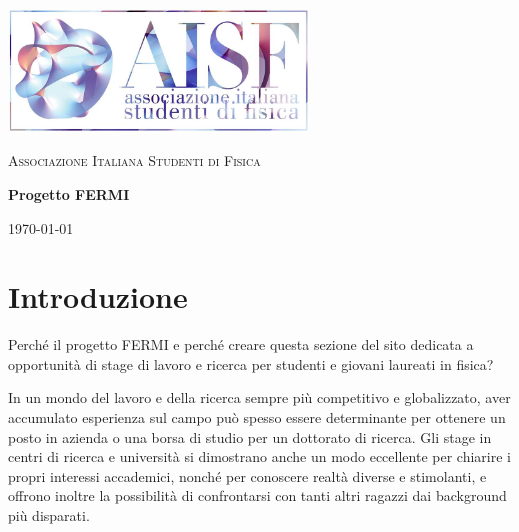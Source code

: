 \documentclass[a4paper,10pt]{article}
\begin{document}
\begin{titlepage}

  \centering
  \includegraphics[width= 80mm]{logo_full.jpg}\par\vspace{1cm}
  {\scshape\LARGE Associazione Italiana Studenti di Fisica \par}
  \vspace{3cm}
  {\huge\bfseries Progetto FERMI\par}

        \vspace{2cm}
  \vfill

  {\centering \large \today\par} %

\end{titlepage}

\newpage

\section*{Introduzione} %

Perché il progetto FERMI e perché creare questa sezione del sito dedicata a opportunità di stage di lavoro e ricerca per studenti e giovani laureati in fisica? \newline

In un mondo del lavoro e della ricerca sempre più competitivo e globalizzato, aver accumulato esperienza sul campo può spesso essere determinante per ottenere un posto in azienda o una borsa di studio per un dottorato di ricerca. Gli stage in centri di ricerca e università si dimostrano anche un modo eccellente per chiarire i propri interessi accademici, nonché per conoscere realtà diverse e stimolanti, e offrono inoltre la possibilità di confrontarsi con tanti altri ragazzi dai background più disparati. \newline
\end{document}
